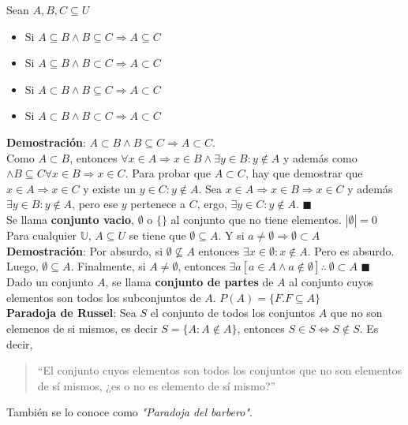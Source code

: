 \documentclass[11pt,a4paper]{article}
\newcommand*{\QEDA}{\null\nobreak\hfill\ensuremath{\blacksquare}}
\begin{document}
\noindent Sean $A, B, C \subseteq U$
\begin{multicols}{2}
\begin{itemize}
\item Si $A \subseteq B \land B \subseteq C \Rightarrow A \subseteq C$
\item Si $A \subseteq B \land B \subset C \Rightarrow A \subset C$
\item Si $A \subset B \land B \subseteq C \Rightarrow A \subset C$
\item Si $A \subset B \land B \subset C \Rightarrow A \subset C$
\end{itemize}
\end{multicols}

\noindent \textbf{Demostraci\'on}: $A \subset B \land B \subseteq C \Rightarrow A \subset C$.\\ Como $A \subset B$, entonces $\forall x \in A \Rightarrow x \in B \land \exists y \in B : y \not \in A$ y adem\'as como $\land B \subseteq C \forall x \in B \Rightarrow x \in C$. Para probar que $A \subset C$, hay que demostrar que $x\in A \Rightarrow x\in C$ y existe un $y \in C : y \not \in A$. Sea $x \in A \Rightarrow x \in B \Rightarrow x \in C$ y adem\'as $\exists y \in B : y \not \in A$, pero ese $y$ pertenece a $C$, ergo, $\exists y \in C : y \not \in A$. \QEDA \\

\noindent Se llama \textbf{conjunto vacio}, $\emptyset$ o $\{\}$ al conjunto que no tiene elementos. $|\emptyset| = 0$\\

\noindent Para cualquier $\mathbb{U}$, $A \subseteq U$ se tiene que $\emptyset \subseteq A$. Y si $a \not = \emptyset \Rightarrow \emptyset \subset A$\\
\noindent \textbf{Demostraci\'on}: Por absurdo, si $\emptyset \not \subseteq A$ entonces $\exists x \in \emptyset : x \not \in A$. Pero es absurdo. Luego, $\emptyset \subseteq A$. Finalmente, si $A \not = \emptyset$, entonces $\exists a[a \in A \land a \not \in \emptyset]\therefore \ \emptyset \subset A$ \QEDA \\

\noindent Dado un conjunto $A$, se llama \textbf{conjunto de partes} de $A$ al conjunto cuyos elementos son todos los subconjuntos de $A$. $P(A) = \{ F . F \subseteq A \}$\\

\noindent \textbf{Paradoja de Russel}: Sea $S$ el conjunto de todos los conjuntos $A$ que no son elemenos de si mismos, es decir $S = \{A: A \not \in A\}$, entonces $S \in S \iff S \not \in S$. Es decir, 
\begin{quote}
“El conjunto cuyos elementos son todos los conjuntos que no son elementos de sí mismos, ¿es o no es elemento de sí mismo?”
\end{quote}
Tambi\'en se lo conoce como \textit{"Paradoja del barbero"}. 
\newpage
\end{document}
